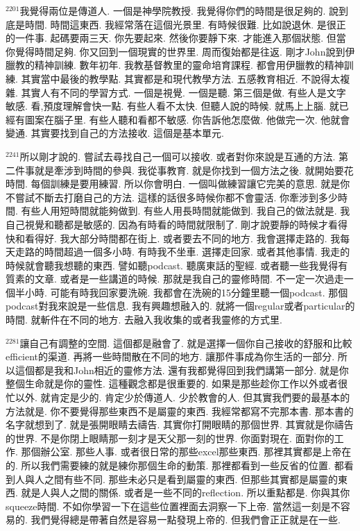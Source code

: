 \documentclass{book}
\begin{document}
$^{2201}$我覺得兩位是傳道人.
一個是神學院教授.
我覺得你們的時間是很足夠的.
說到底是時間.
時間這東西.
我經常落在這個光景里.
有時候很難.
比如說退休.
是很正的一件事.
起碼要兩三天.
你先要起來.
然後你要靜下來.
才能進入那個狀態.
但當你覺得時間足夠.
你又回到一個現實的世界里.
周而復始都是往返.
剛才John說到伊臘教的精神訓練.
數年初年.
我教基督教里的靈命培育課程.
都會用伊臘教的精神訓練.
其實當中最後的教學點.
其實都是和現代教學方法.
五感教育相近.
不說得太複雜.
其實人有不同的學習方式.
一個是視覺.
一個是聽.
第三個是做.
有些人是文字敏感.
看,預度理解會快一點.
有些人看不太快.
但聽人說的時候.
就馬上上腦.
就已經有圖案在腦子里.
有些人聽和看都不敏感.
你告訴他怎麼做.
他做完一次.
他就會變通.
其實要找到自己的方法接收.
這個是基本單元.

$^{2241}$所以剛才說的.
嘗試去尋找自己一個可以接收.
或者對你來說是互通的方法.
第二件事就是牽涉到時間的參與.
我從事教育.
就是你找到一個方法之後.
就開始要花時間.
每個訓練是要用練習.
所以你會明白.
一個叫做練習讓它完美的意思.
就是你不嘗試不斷去打磨自己的方法.
這樣的話很多時候你都不會靈活.
你牽涉到多少時間.
有些人用短時間就能夠做到.
有些人用長時間就能做到.
我自己的做法就是.
我自己視覺和聽都是敏感的.
因為有時看的時間就限制了.
剛才說要靜的時候才看得快和看得好.
我大部分時間都在街上.
或者要去不同的地方.
我會選擇走路的.
我每天走路的時間超過一個多小時.
有時我不坐車.
選擇走回家.
或者其他事情.
我走的時候就會聽我想聽的東西.
譬如聽podcast.
聽廣東話的聖經.
或者聽一些我覺得有質素的文章.
或者是一些講道的時候.
那就是我自己的靈修時間.
不一定一次過走一個半小時.
可能有時我回家要洗碗.
我都會在洗碗的15分鐘里聽一個podcast.
那個podcast對我來說是一些信息.
我有興趣想融入的.
就將一個regular或者particular的時間.
就斬件在不同的地方.
去融入我收集的或者我靈修的方式里.

$^{2281}$讓自己有調整的空間.
這個都是融會了.
就是選擇一個你自己接收的舒服和比較efficient的渠道.
再將一些時間散在不同的地方.
讓那件事成為你生活的一部分.
所以這個都是我和John相近的靈修方法.
還有我都覺得回到我們講第一部分.
就是你整個生命就是你的靈性.
這種觀念都是很重要的.
如果是那些趁你工作以外或者很忙以外.
就肯定是少的.
肯定少於傳道人.
少於教會的人.
但其實我們要的最基本的方法就是.
你不要覺得那些東西不是屬靈的東西.
我經常都寫不完那本書.
那本書的名字就想到了.
就是張開眼睛去禱告.
其實你打開眼睛的那個世界.
其實就是你禱告的世界.
不是你閉上眼睛那一刻才是天父那一刻的世界.
你面對現在.
面對你的工作.
那個辦公室.
那些人事.
或者很日常的那些excel那些東西.
那裡其實都是上帝在的.
所以我們需要練的就是練你那個生命的動策.
那裡都看到一些反省的位置.
都看到人與人之間有些不同.
那些未必只是看到屬靈的東西.
但那些其實都是屬靈的東西.
就是人與人之間的關係.
或者是一些不同的reflection.
所以重點都是.
你與其你squeeze時間.
不如你學習一下在這些位置裡面去洞察一下上帝.
當然這一刻是不容易的.
我們覺得總是帶著自然是容易一點發現上帝的.
但我們會正正就是在一些.
\end{document}
